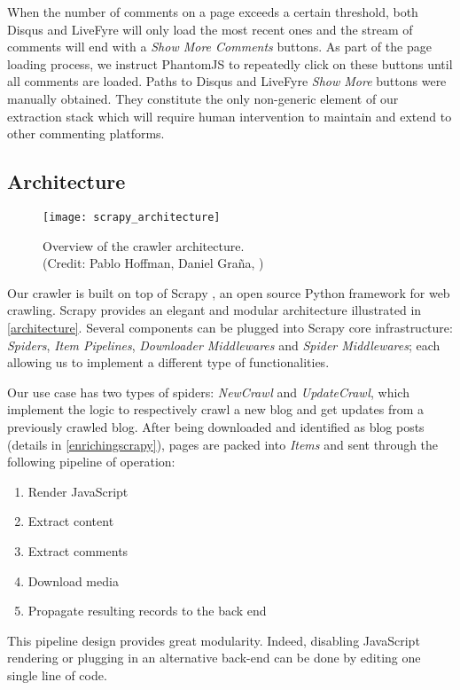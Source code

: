 When the number of comments on a page exceeds a certain threshold, both Disqus and LiveFyre will only load the most recent ones and the stream of comments will end with a \emph{Show More Comments} buttons. As part of the page loading process, we instruct PhantomJS to repeatedly click on these buttons until all comments are loaded. Paths to Disqus and LiveFyre \emph{Show More} buttons were manually obtained. They constitute the only non-generic element of our extraction stack which will require human intervention to maintain and extend to other commenting platforms.


\subsection{Architecture}

\begin{figure}
  \capstart
  \centering
  \texttt{[image: scrapy\_architecture]}
  \caption{Overview of the crawler architecture.\\(Credit: Pablo Hoffman, Daniel Graña, \cite{scrapy2013})}
  \label{architecture}
\end{figure}

Our crawler is built on top of Scrapy \cite{scrapy2013}, an open source Python framework for web crawling. Scrapy provides an elegant and modular architecture illustrated in \autoref{architecture}. Several components can be plugged into Scrapy core infrastructure: \emph{Spiders}, \emph{Item Pipelines}, \emph{Downloader Middlewares} and \emph{Spider Middlewares}; each allowing us to implement a different type of functionalities.

Our use case has two types of spiders: \emph{NewCrawl} and \emph{UpdateCrawl}, which implement the logic to respectively crawl a new blog and get updates from a previously crawled blog. After being downloaded and identified as blog posts (details in \ref{enrichingscrapy}), pages are packed into \emph{Items} and sent through the following pipeline of operation:
\begin{enumerate}[noitemsep]
  \item Render JavaScript
  \item Extract content
  \item Extract comments
  \item Download media
  \item Propagate resulting records to the back end
\end{enumerate}
This pipeline design provides great modularity. Indeed, disabling JavaScript rendering or plugging in an alternative back-end can be done by editing one single line of code.


